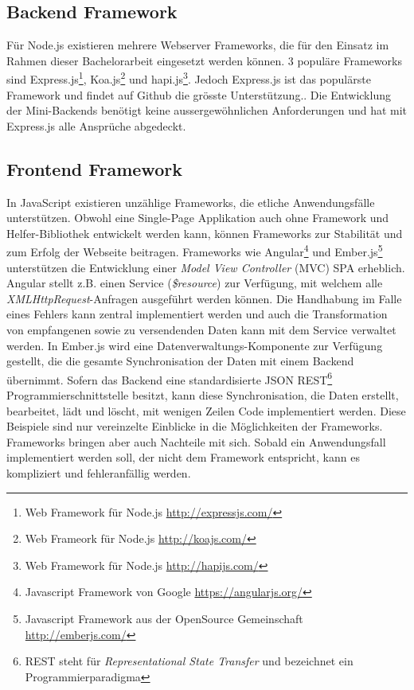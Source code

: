 \subsection{Backend Framework}
Für Node.js existieren mehrere Webserver Frameworks, die für den Einsatz im Rahmen dieser Bachelorarbeit eingesetzt werden können. 3 populäre Frameworks sind Express.js\footnote{Web Framework für Node.js \url{http://expressjs.com/}}, Koa.js\footnote{Web Frameork für Node.js \url{http://koajs.com/}} und hapi.js\footnote{Web Framework für Node.js \url{http://hapijs.com/}}. Jedoch Express.js ist das populärste Framework und findet auf Github die grösste Unterstützung.\citep[]{nodejsframeworks}. Die Entwicklung der Mini-Backends benötigt keine aussergewöhnlichen Anforderungen und hat mit Express.js alle Ansprüche abgedeckt.

\subsection{Frontend Framework}
In JavaScript existieren unzählige Frameworks, die etliche Anwendungsfälle unterstützen. Obwohl eine Single-Page Applikation auch ohne Framework und Helfer-Bibliothek entwickelt werden kann, können Frameworks zur Stabilität und zum Erfolg der Webseite beitragen. Frameworks wie Angular\footnote{Javascript Framework von Google \url{https://angularjs.org/}} und Ember.js\footnote{Javascript Framework aus der OpenSource Gemeinschaft \url{http://emberjs.com/}} unterstützen die Entwicklung einer \textit{Model View Controller} (MVC) SPA erheblich. Angular stellt z.B. einen Service (\textit{\$resource}) zur Verfügung, mit welchem alle \textit{XMLHttpRequest}-Anfragen ausgeführt werden können. Die Handhabung im Falle eines Fehlers kann zentral implementiert werden und auch die Transformation von empfangenen sowie zu versendenden Daten kann mit dem Service verwaltet werden. In Ember.js wird eine Datenverwaltungs-Komponente zur Verfügung gestellt, die die gesamte Synchronisation der Daten mit einem Backend übernimmt. Sofern das Backend eine standardisierte JSON REST\footnote{REST steht für \textit{Representational State Transfer} und bezeichnet ein Programmierparadigma} Programmierschnittstelle besitzt, kann diese Synchronisation, die Daten erstellt, bearbeitet, lädt und löscht, mit wenigen Zeilen Code implementiert werden. Diese Beispiele sind nur vereinzelte Einblicke in die Möglichkeiten der Frameworks. Frameworks bringen aber auch Nachteile mit sich. Sobald ein Anwendungsfall implementiert werden soll, der nicht dem Framework entspricht, kann es kompliziert und fehleranfällig werden.
